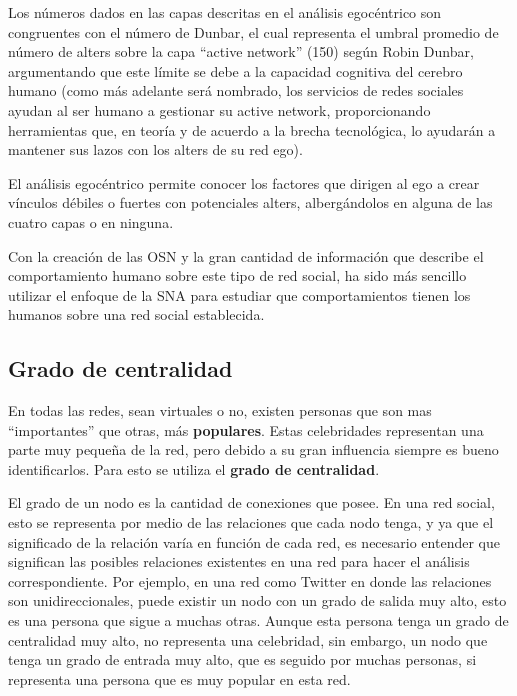 Los números dados en las capas descritas en el análisis egocéntrico son congruentes con el número de Dunbar, el cual representa el umbral promedio de número de alters sobre la capa “active network” (150) según Robin Dunbar, argumentando que este límite se debe a la capacidad cognitiva del cerebro humano \cite[Pag. 3]{dynamics} (como más adelante será nombrado, los servicios de redes sociales ayudan al ser humano a gestionar su active network, proporcionando herramientas que, en teoría y de acuerdo a la brecha tecnológica, lo ayudarán a mantener sus lazos con los alters de su red ego).

El análisis egocéntrico permite conocer los factores que dirigen al ego a crear vínculos débiles o fuertes con potenciales alters, albergándolos en alguna de las cuatro capas o en ninguna.

Con la creación de las OSN y la gran cantidad de información que describe el comportamiento humano sobre este tipo de red social, ha sido más sencillo utilizar el enfoque de la SNA para estudiar que comportamientos tienen los humanos sobre una red social establecida.

\subsection{Grado de centralidad}

En todas las redes, sean virtuales o no, existen personas que son mas ``importantes'' que otras, más \textbf{populares}. Estas celebridades representan una parte muy pequeña de la red, pero debido a su gran influencia siempre es bueno identificarlos. Para esto se utiliza el \textbf{grado de centralidad}.

El grado de un nodo es la cantidad de conexiones que posee. En una red social, esto se representa por medio de las relaciones que cada nodo tenga, y ya que el significado de la relación varía en función de cada red, es necesario entender que significan las posibles relaciones existentes en una red para hacer el análisis correspondiente. Por ejemplo, en una red como Twitter en donde las relaciones son unidireccionales, puede existir un nodo con un grado de salida muy alto, esto es una persona que sigue a muchas otras. Aunque esta persona tenga un grado de centralidad muy alto, no representa una celebridad, sin embargo, un nodo que tenga un grado de entrada muy alto, que es seguido por muchas personas, si representa una persona que es muy popular en esta red.

